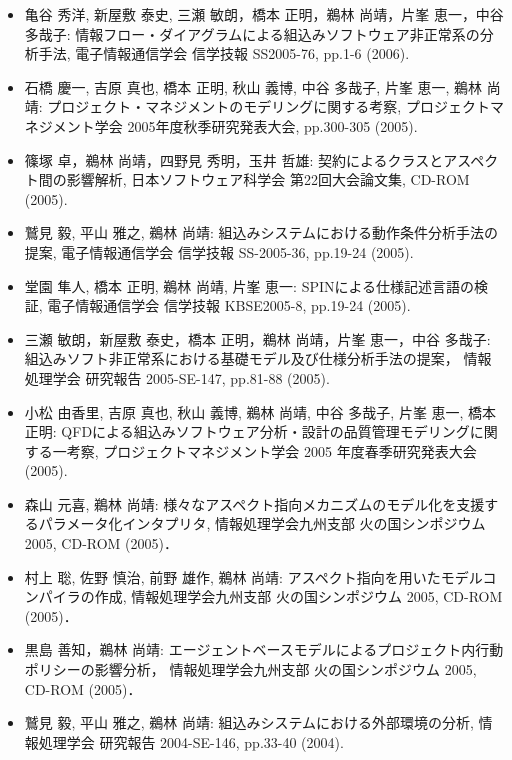 \documentclass{jarticle}
\begin{document}
\begin{itemize}
\item 亀谷 秀洋, 新屋敷 泰史, 三瀬 敏朗，橋本 正明，鵜林 尚靖，片峯 恵一，中谷 多哉子:
情報フロー・ダイアグラムによる組込みソフトウェア非正常系の分析手法,
電子情報通信学会 信学技報 SS2005-76, pp.1-6 (2006).

\item 石橋 慶一, 吉原 真也, 橋本 正明, 秋山 義博, 中谷 多哉子, 片峯 恵一, 鵜林 尚靖:
プロジェクト・マネジメントのモデリングに関する考察,
プロジェクトマネジメント学会 2005年度秋季研究発表大会, pp.300-305 (2005).

\item 篠塚 卓，鵜林 尚靖，四野見 秀明，玉井 哲雄:
契約によるクラスとアスペクト間の影響解析,
日本ソフトウェア科学会 第22回大会論文集, CD-ROM (2005).

\item 鷲見 毅, 平山 雅之, 鵜林 尚靖:
組込みシステムにおける動作条件分析手法の提案,
電子情報通信学会 信学技報 SS-2005-36, pp.19-24 (2005).

\item 堂園 隼人, 橋本 正明, 鵜林 尚靖, 片峯 恵一:
SPINによる仕様記述言語の検証,
電子情報通信学会 信学技報 KBSE2005-8, pp.19-24 (2005).

\item 三瀬 敏朗，新屋敷 泰史，橋本 正明，鵜林 尚靖，片峯 恵一，中谷 多哉子:
組込みソフト非正常系における基礎モデル及び仕様分析手法の提案，
情報処理学会 研究報告 2005-SE-147, pp.81-88 (2005).

\item 小松 由香里, 吉原 真也, 秋山 義博, 鵜林 尚靖, 中谷 多哉子, 片峯 恵一, 橋本正明:
QFDによる組込みソフトウェア分析・設計の品質管理モデリングに関する一考察,
プロジェクトマネジメント学会 2005 年度春季研究発表大会 (2005).

\item 森山 元喜, 鵜林 尚靖:
様々なアスペクト指向メカニズムのモデル化を支援するパラメータ化インタプリタ,
情報処理学会九州支部 火の国シンポジウム 2005, CD-ROM (2005)．

\item 村上 聡, 佐野 慎治, 前野 雄作, 鵜林 尚靖:
アスペクト指向を用いたモデルコンパイラの作成,
情報処理学会九州支部 火の国シンポジウム 2005, CD-ROM (2005)．

\item 黒島 善知，鵜林 尚靖:
エージェントベースモデルによるプロジェクト内行動ポリシーの影響分析，
情報処理学会九州支部 火の国シンポジウム 2005, CD-ROM (2005)．

\item 鷲見 毅, 平山 雅之, 鵜林 尚靖:
組込みシステムにおける外部環境の分析,
情報処理学会 研究報告 2004-SE-146, pp.33-40 (2004).


\end{itemize}
\end{document}
